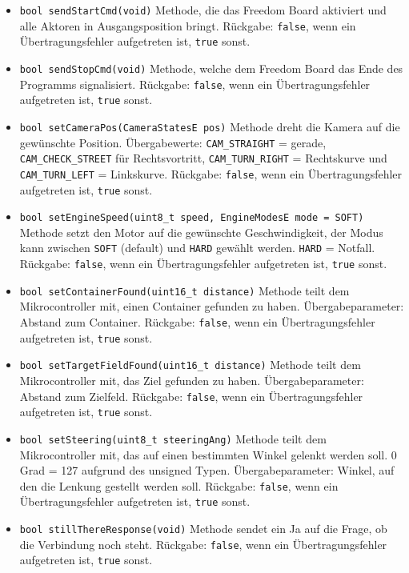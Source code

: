 \documentclass[a4paper, 10pt, fleqn]{article}
\newcommand{\code}[1]{\texttt{#1}}
\begin{document}
\begin{itemize}
\item \code{bool sendStartCmd(void)} Methode, die das Freedom Board aktiviert und alle Aktoren in Ausgangsposition bringt. Rückgabe: \code{false}, wenn ein Übertragungsfehler aufgetreten ist, \code{true} sonst.
%
\item \code{bool sendStopCmd(void)} Methode, welche dem Freedom Board das Ende des Programms signalisiert.  Rückgabe: \code{false}, wenn ein Übertragungsfehler aufgetreten ist, \code{true} sonst.
%
\item \code{bool setCameraPos(CameraStatesE pos)} Methode dreht die Kamera auf die gewünschte Position. Übergabewerte: \code{CAM\_STRAIGHT} = gerade, \code{CAM\_CHECK\_STREET} für Rechtsvortritt, \code{CAM\_TURN\_RIGHT} = Rechtskurve und \code{CAM\_TURN\_LEFT} = Linkskurve. Rückgabe: \code{false}, wenn ein Übertragungsfehler aufgetreten ist, \code{true} sonst.
%
\item \code{bool setEngineSpeed(uint8\_t speed, EngineModesE mode = SOFT)} Methode setzt den Motor auf die gewünschte Geschwindigkeit, der Modus kann zwischen \code{SOFT} (default) und \code{HARD} gewählt werden. \code{HARD} = Notfall. Rückgabe: \code{false}, wenn ein Übertragungsfehler aufgetreten ist, \code{true} sonst.
%
\item \code{bool setContainerFound(uint16\_t distance)} Methode teilt dem Mikrocontroller mit, einen Container gefunden zu haben. Übergabeparameter: Abstand zum Container. Rückgabe: \code{false}, wenn ein Übertragungsfehler aufgetreten ist, \code{true} sonst.
%
\item \code{bool setTargetFieldFound(uint16\_t distance)}  Methode teilt dem Mikrocontroller mit, das Ziel gefunden zu haben. Übergabeparameter: Abstand zum Zielfeld. Rückgabe: \code{false}, wenn ein Übertragungsfehler aufgetreten ist, \code{true} sonst.
%
\item \code{bool setSteering(uint8\_t steeringAng)}  Methode teilt dem Mikrocontroller mit, das auf einen bestimmten Winkel gelenkt werden soll. 0 Grad = 127 aufgrund des unsigned Typen. Übergabeparameter: Winkel, auf den die Lenkung gestellt werden soll. Rückgabe: \code{false}, wenn ein Übertragungsfehler aufgetreten ist, \code{true} sonst.
%
\item \code{bool stillThereResponse(void)} Methode sendet ein Ja auf die Frage, ob die Verbindung noch steht.  Rückgabe: \code{false}, wenn ein Übertragungsfehler aufgetreten ist, \code{true} sonst.
\end{itemize}
\end{document}
